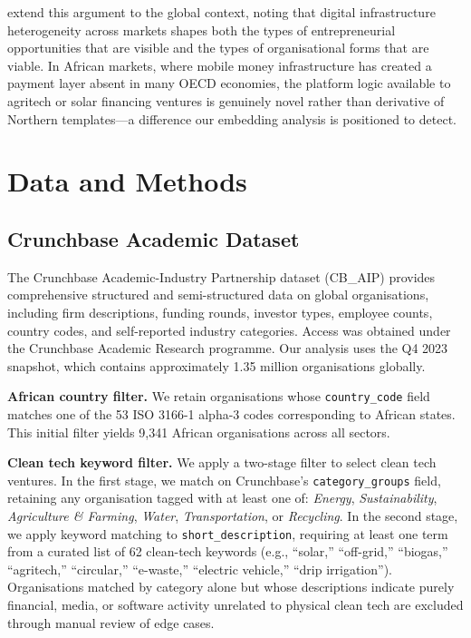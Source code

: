 \documentclass[review,12pt]{elsarticle}
\begin{document}
\citet{nambisan2019entrepreneurship} extend this argument to the
global context, noting that digital infrastructure heterogeneity
across markets shapes both the types of entrepreneurial opportunities
that are visible and the types of organisational forms that are viable.
In African markets, where mobile money infrastructure has created a
payment layer absent in many OECD economies, the platform logic
available to agritech or solar financing ventures is genuinely novel
rather than derivative of Northern templates---a difference our
embedding analysis is positioned to detect.


\section{Data and Methods}
\label{sec:data}

\subsection{Crunchbase Academic Dataset}

The Crunchbase Academic-Industry Partnership dataset (CB\_AIP)
provides comprehensive structured and semi-structured data on global
organisations, including firm descriptions, funding rounds, investor
types, employee counts, country codes, and self-reported industry
categories. Access was obtained under the Crunchbase Academic Research
programme. Our analysis uses the Q4 2023 snapshot, which contains
approximately 1.35 million organisations globally.

\textbf{African country filter.} We retain organisations whose
\texttt{country\_code} field matches one of the 53 ISO 3166-1
alpha-3 codes corresponding to African states. This initial filter
yields 9,341 African organisations across all sectors.

\textbf{Clean tech keyword filter.} We apply a two-stage filter to
select clean tech ventures. In the first stage, we match on
Crunchbase's \texttt{category\_groups} field, retaining any
organisation tagged with at least one of: \textit{Energy},
\textit{Sustainability}, \textit{Agriculture \& Farming},
\textit{Water}, \textit{Transportation}, or \textit{Recycling}.
In the second stage, we apply keyword matching to
\texttt{short\_description}, requiring at least one term from a
curated list of 62 clean-tech keywords (e.g., ``solar,''
``off-grid,'' ``biogas,'' ``agritech,'' ``circular,'' ``e-waste,''
``electric vehicle,'' ``drip irrigation''). Organisations matched by
category alone but whose descriptions indicate purely financial,
media, or software activity unrelated to physical clean tech are
excluded through manual review of edge cases.
\end{document}
